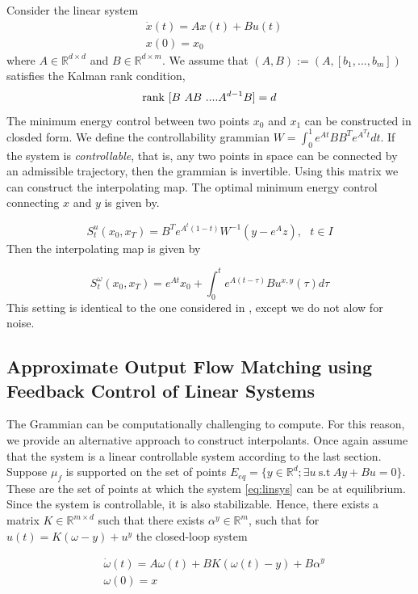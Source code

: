 \documentclass{article}
\newcommand{\Rd}{\mathbb{R}^d}
\newcommand{\R}{\mathbb{R}}
\begin{document}
Consider the linear system
\begin{align}
\label{eq:linsys}
& \dot{x}(t) = Ax(t) +B u(t) \nonumber \\
& x(0) = x_0
\end{align}
where $A \in \R^{d \times d}$ and $B \in \R^{d \times m}$. We assume that 
$(A,B):=(A,[b_1,...,b_m])$ satisfies the Kalman rank condition, 
\begin{equation}
{\rm rank}~ [B~AB~....A^{d-1}B] = d
\end{equation}
The minimum energy control between two points $x_0$ and $x_1$ can be constructed in closded form.
We define the controllability grammian
$W  = \int_0^1 e^{At}BB^Te^{A^Tt}dt$. If the system is {\it controllable}, that is, any two points in space can be connected by an admissible trajectory, then the grammian is invertible.  Using this matrix we can construct the interpolating map. 
The optimal minimum energy control connecting $x$ and $y$ is given by.

\[S^u_t(x_0,x_T) =B^T e^{A^t(1-t)} W^{-1}(y - e^{A}z),~~~ t\in I \]
Then the interpolating map is given by

\[S^{\omega}_t(x_0,x_T) = e^{At}x_0 + \int_0^t e^{A(t-\tau)}Bu^{x,y}(\tau)d\tau \]
This setting is identical to the one considered in \cite{mei2025flow}, except we do not alow for noise. 
\subsection{Approximate Output Flow Matching using Feedback Control of Linear Systems}
 The Grammian can be computationally challenging to compute. For this reason, we provide an alternative approach to construct interpolants.
 Once again assume that the system is a linear controllable system according to the last section. Suppose $\mu_f$ is supported on the set of points $E_{eq} = \{ y \in \Rd; \exists u ~ \text{s.t}~ Ay+Bu = 0\}$. These are the set of points at which the system \eqref{eq:linsys} can be at equilibrium. Since the system is controllable, it is also stabilizable. Hence, there exists a matrix $K \in \R^{m \times d} $ such that there exists $\alpha^{y} \in \R^m$, such that for $u(t) = K(\omega - y) + u^y$ the closed-loop system

\begin{align}
\label{eq:clplinsys}
& \dot{\omega}(t) = A\omega(t)+B  K(\omega(t) - y) + B\alpha^y  \nonumber \\
& \omega(0) = x
\end{align}
\end{document}
